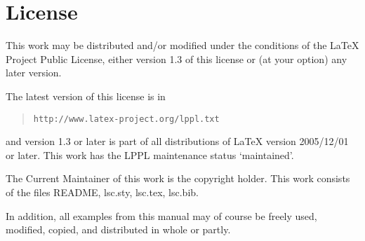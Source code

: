 \documentclass{article}
\begin{document}
\printindex




\clearpage
\appendix
\section*{License}

This work may be distributed and/or modified under the conditions of the
\LaTeX{} Project Public License, either version 1.3 of this license or (at
your option) any later version.

The latest version of this license is in
%
\begin{quote}
\tt http://www.latex-project.org/lppl.txt
\end{quote}
%
and version 1.3 or later is part of all distributions of \LaTeX{} version
2005/12/01 or later.
%
This work has the LPPL maintenance status `maintained'.

The Current Maintainer of this work is the copyright holder.
%
This work consists of the files README, lsc.sty, lsc.tex, lsc.bib.

\medskip

In addition, all examples from this manual may of course be freely used,
modified, copied, and distributed in whole or partly.
\end{document}
